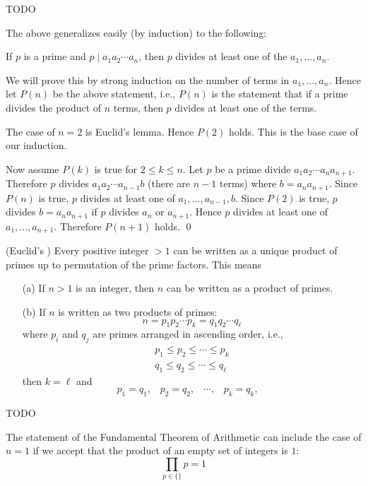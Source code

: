\proof
TODO


The above generalizes easily (by induction) to the following:


\begin{cor}
If $p$ is a prime and $p \mid a_1 a_2 \cdots a_n$, then 
$p$ divides at least one of the $a_1, \ldots, a_n$.
\end{cor}
\proof
We will prove this by strong induction on the number of terms
in $a_1, ..., a_n$.
Hence let $P(n)$ be the above statement, i.e., $P(n)$ is the
statement that if a prime divides the product of $n$ terms,
then $p$ divides at least one of the terms.

The case of $n = 2$ is Euclid's lemma.
Hence $P(2)$ holds.
This is the base case of our induction.

Now assume $P(k)$  is true for $2 \leq k \leq n$.
Let $p$ be a prime divide $a_1 a_2 \cdots a_n a_{n + 1}$.
Therefore $p$ divides $a_1 a_2 \cdots a_{n-1} b$ (there are $n - 1$ terms)
where $b = a_n a_{n + 1}$.
Since $P(n)$ is true, $p$ divides at least one of $a_1, ..., a_{n - 1}, b$.
Since $P(2)$ is true,
$p$ divides $b = a_n a_{n + 1}$ if $p$ divides $a_n$ or $a_{n + 1}$.
Hence $p$ divides at least one of $a_1, ..., a_{n + 1}$.
Therefore $P(n + 1)$ holds.
\qed

\begin{thm} \textnormal{(Euclid's )}
Every positive integer $> 1$ can be written as a unique product of primes
up to permutation of the prime factors.
This means
\begin{enumerate}[nosep,label=\textnormal{(\alph*)}]
\item[(a)] If $n > 1$ is an integer, then $n$ can be written as a product
of primes.
\item[(b)] If $n$ is written as two products of primes:
\[
n = p_1 p_2 \cdots p_k = q_1 q_2 \cdots q_\ell
\]
where $p_i$ and $q_j$ are primes arranged in ascending order, i.e.,
\begin{align*}
p_1 \leq p_2 \leq \cdots \leq p_k \\
q_1 \leq q_2 \leq \cdots \leq q_\ell
\end{align*}
then $k = \ell$ and 
\[
p_1 = q_1, \,\,\,\,\,
p_2 = q_2, \,\,\,\,\,
\cdots, \,\,\,\,\,
p_k = q_k, \,\,\,\,\,
\]
\end{enumerate}
\end{thm}

\proof
TODO

The statement of the Fundamental Theorem of Arithmetic can include
the case of $n = 1$ if we accept that the product of an empty
set of integers is $1$:
\[
\prod_{p \in \{\}} p = 1
\]


